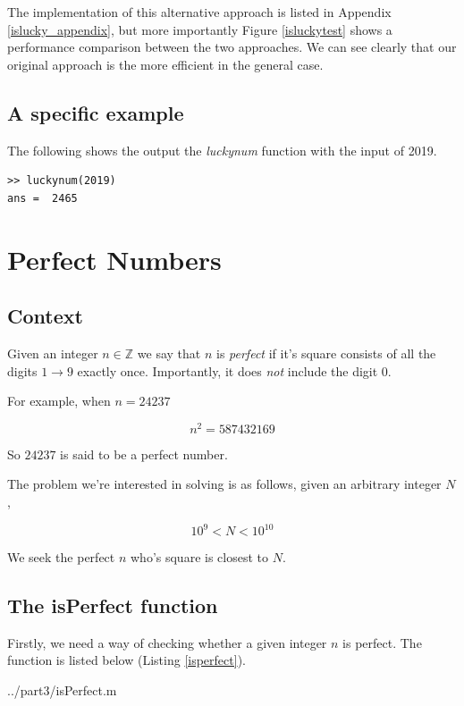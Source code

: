\documentclass[10pt]{article}
\begin{document}
The implementation of this alternative approach is listed in Appendix \ref{islucky_appendix}, but more importantly Figure \ref{isluckytest} shows a performance comparison between the two approaches. We can see clearly that our original approach is the more efficient in the general case.

\subsection{A specific example}

The following shows the output the \emph{luckynum} function with the input of 2019.

\begin{verbatim}
>> luckynum(2019)
ans =  2465
\end{verbatim}

\section{Perfect Numbers}

\subsection{Context}
Given an integer $n \in \mathbb{Z}$ we say that $n$ is \emph{perfect} if it's square consists of all the digits $1 \rightarrow 9$ exactly once. Importantly, it does \emph{not} include the digit $0$.

For example, when $ n = 24237 $

$$ n^2 = 587432169 $$

So $24237$ is said to be a perfect number.

The problem we're interested in solving is as follows, given an arbitrary integer $N$,  

\begin{equation} \label{rangeN}
10^9 < N < 10^{10}
\end{equation}


We seek the perfect $n$ who's square is closest to $N$.

\subsection{The isPerfect function}

Firstly, we need a way of checking whether a given integer $n$ is perfect. The function is listed below (Listing \ref{isperfect}).

  {../part3/isPerfect.m}
 
\end{document}
